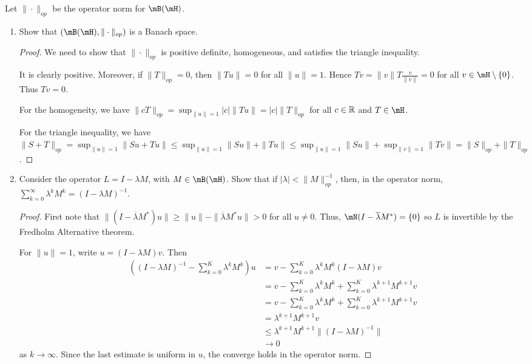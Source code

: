 \documentclass{article}
\begin{document}
 Let $\| \cdot \|_{op}$ be the operator norm for $\mB(\mH)$.
\begin{enumerate}
\item Show that $(\mB(\mH), \|\cdot \|_{op})$ is a Banach space.
\begin{proof}
We need to show that $\| \cdot \|_{op}$ is positive definite, homogeneous, and satisfies the triangle inequality.  

It is clearly positive. Moreover, if $\|T\|_{op} = 0$, then $\|Tu\| = 0$ for all $\|u\| = 1$.  Hence $Tv = \|v\| T \frac v {\|v\|} = 0$ for all $v \in \mH \setminus \{0\}$.  Thus $Tv = 0$.

For the homogeneity, we have $\|cT\|_{op} = \sup_{\|u\| = 1} |c|\|Tu\| = |c| \|T\|_{op}$ for all $c \in \mathbb{R}$ and $T \in \mH$.

For the triangle inequality, we have 
$\|S + T \|_{op} = \sup_{\|u\|=1} \|Su + Tu\| \le \sup_{\|u\|=1} \|Su \| + \|Tu\| 
\le \sup_{\|u\|=1} \|Su \| + \sup_{\|v\| = 1} \|Tv\|  = \|S\|_{op} + \|T\|_{op}$.
\end{proof}

\item Consider the operator $L = I - \lambda M$, with $M \in \mB(\mH)$. Show that if $|\lambda| < \|M \|_{op}^{-1}$, then, in the operator norm,
$\sum_{k=0}^\infty \lambda^k M^k = (I - \lambda M)^{-1}$.

\begin{proof}
First note that $\|(I - \overline \lambda M^*)u\| \ge \|u\| - \|\overline \lambda M^* u\| > 0$ for all $u \neq 0$.  Thus, $\mN(I - \overline \lambda M^*) = \{0\}$ so $L$ is invertible by the Fredholm Alternative theorem.

For $\|u\| = 1$, write $u = (I - \lambda M)v$. Then
\begin{align*}
((I - \lambda M)^{-1} - \sum_{k=0}^K \lambda^k M^k) u & = v - \sum_{k=0}^K \lambda^k M^k (I - \lambda M)v
\\ & = v - \sum_{k=0}^K \lambda^k M^k +  \sum_{k=0}^K \lambda^{k+1} M^{k+1} v
\\ & = v - \sum_{k=0}^K \lambda^k M^k +  \sum_{k=0}^K \lambda^{k+1} M^{k+1} v
\\ & = \lambda^{k+1} M^{k+1} v
\\ & \le \lambda^{k+1} M^{k+1} \|(I - \lambda M)^{-1}\|
\\ & \to 0
\end{align*}
as $k \to \infty$. Since the last estimate is uniform in $u$, the converge holds in the operator norm.
\end{proof}

\end{enumerate}
\end{document}
